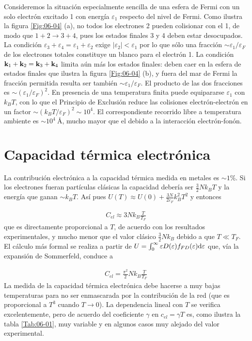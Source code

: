 Consideremos la situación especialmente sencilla de una esfera de Fermi con un solo electrón excitado 1 con energía $\varepsilon_1$ respecto del nivel de Fermi. Como ilustra la figura \ref{Fig:06-04} (a), no todos los electrones 2 pueden colisionar con el 1, de modo que $1+2\rightarrow3+4$, pues los estados finales 3 y 4 deben estar desocupados. La condición $\varepsilon_3 + \varepsilon_4 = \varepsilon_1 + \varepsilon_2$ exige $|\varepsilon_2|<\varepsilon_1$ por lo que sólo una fracción $\sim \varepsilon_1 / \varepsilon_F$ de los electrones totales constituye un blanco para el electrón 1. La condición $\mathbf{k}_1 + \mathbf{k}_2 = \mathbf{k}_3 + \mathbf{k}_4$ limita aún más los estados finales: deben caer en la esfera de estados finales que ilustra la figura \ref{Fig:06-04} (b), y fuera del mar de Fermi la fracción permitida resulta ser también $\sim \varepsilon_1 / \varepsilon_F$. El producto de las dos fracciones es $\sim (\varepsilon_1/\varepsilon_F)^2$. 
En presencia de una temperatura finita puede equipararse $\varepsilon_1$ con $k_BT$, con lo que el Principio de Exclusión reduce las colisiones electrón-electrón en un factor $\sim (k_BT/\varepsilon_F)^2 \sim 10^4$. El correspondiente recorrido libre a temperatura ambiente es $\sim 10^4 \ \unit{\angstrom}$, mucho mayor que el debido a la interacción electrón-fonón.

\section{Capacidad térmica electrónica}

La contribución electrónica a la capacidad térmica medida en metales es $\sim 1\%$. Si los electrones fueran partículas clásicas la capacidad debería ser $\frac{3}{2} N k_BT$ y la energía que ganan $\sim k_B T$. Así pues $U(T) \approx U(0)+\frac{3N}{2\varepsilon_F} k_B^2 T^2$ y entonces

\begin{eqnarray}
	C_{el} \approx 3 N k_B \frac{T}{T_F}
\end{eqnarray}
que es directamente proporcional a $T$, de acuerdo con los resultados experimentales, y mucho menor que el valor clásico $\frac{3}{2} Nk_B$  debido a que $T\ll T_F$. El cálculo más formal se realiza a partir de $U=\int_{0}^{\infty} \varepsilon D(\varepsilon) f_{FD} (\varepsilon) \mathrm{d} \varepsilon$ que, vía la expansión de Sommerfeld, conduce a 

\begin{eqnarray}
	C_{el} = \frac{\pi^2}{2} N k_B \frac{T}{T_F}
\end{eqnarray}
La medida de la capacidad térmica electrónica debe hacerse a muy bajas temperaturas para no ser enmascarada por la contribución de la red (que es proporcional a $T^3$ cuando $T\rightarrow 0$). La dependencia lineal con $T$ se verifica excelentemente, pero de acuerdo del coeficiente $\gamma$ en $c_{el} = \gamma T$ es, como ilustra la tabla \ref{Tab:06-01}, muy variable y en algunos casos muy alejado del valor experimental.

